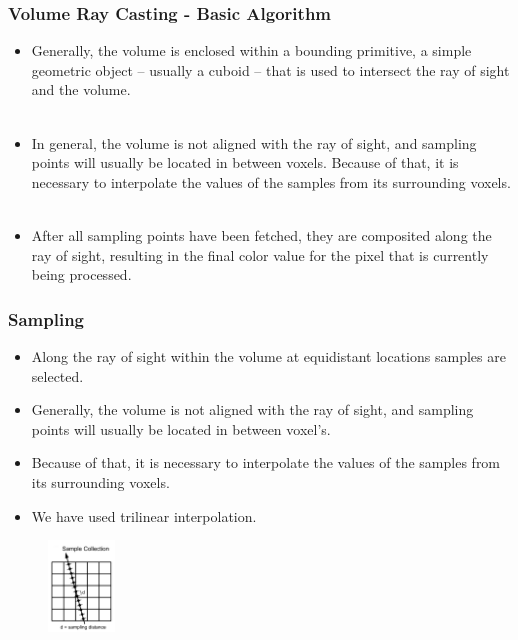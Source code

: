 \documentclass{beamer}
\begin{document}
\begin{frame}
\frametitle{Volume Ray Casting -  Basic Algorithm}
\begin{itemize}
\item Generally, the volume is enclosed within a bounding primitive, a simple geometric object – usually a cuboid – that is used to intersect the ray of sight and the volume. \\ $ $
\item In general, the volume is not aligned with the ray of sight, and sampling points will usually be located in between voxels. Because of that, it is necessary to interpolate the values of the samples from its surrounding voxels. \\ $ $
\item After all sampling points have been fetched, they are composited along the ray of sight, resulting in the final color value for the pixel that is currently being processed.
\end{itemize}
\end{frame}



\begin{frame}
\frametitle{Sampling}
\begin{itemize}
\item Along the ray of sight within the volume at equidistant locations samples are selected. 
\item Generally, the volume is not aligned with the ray of sight, and sampling points will usually be located in between voxel's.
\item Because of that, it is necessary to interpolate the values of the samples from its surrounding voxels.
\item We have used trilinear interpolation.
\end{itemize}
\begin{figure}
\centering
\includegraphics[width=50pt]{sampling1.jpg}
\end{figure}
\end{frame}

\end{document}
